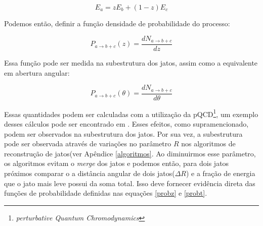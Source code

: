 \begin{equation}
 E_a = z E_b + (1-z)E_c
\end{equation}

Podemos então, definir a função densidade de probabilidade do processo:

\begin{equation}
 P_{a \longrightarrow b+c}(z) = \frac{dN_{a \longrightarrow b+c}}{dz}
 \label{probz}
\end{equation}

Essa função pode ser medida na subestrutura dos jatos, assim como a equivalente em abertura angular:

\begin{equation}
 P_{a \longrightarrow b+c}(\theta) = \frac{dN_{a \longrightarrow b+c}}{d\theta}
 \label{probt}
\end{equation}

Essas quantidades podem ser calculadas com a utilização da pQCD\footnote{\emph{perturbative Quantum Chromodynamics}}, um exemplo desses
cálculos pode ser encontrado em \cite{seymour_jet_1998}. Esses efeitos, como supramencionado, podem ser observados na subestrutura dos
jatos. Por sua vez, a subestrutura pode ser observada através de variações no parâmetro $R$ nos algoritmos de reconstrução de jatos(ver
Apêndice \ref{algoritmos}. Ao diminuirmos esse parâmetro, os algoritmos evitam o \emph{merge} dos jatos e podemos então, para dois
jatos próximos comparar o a distância angular de dois jatos($\Delta R$) e a fração de energia que o jato mais leve possui da soma total.
Isso deve fornecer evidência direta das funções de probabilidade definidas nas equações \eqref{probz} e \eqref{probt}.